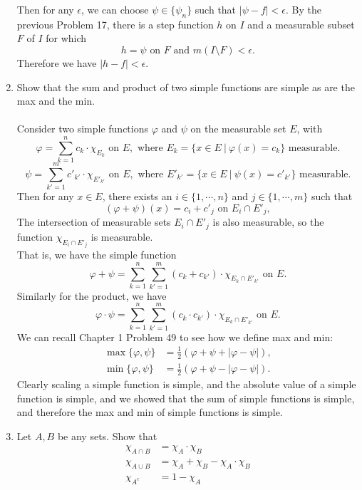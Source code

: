 \begin{enumerate}
    Then for any $\epsilon$, we can choose $\psi\in\{\psi_n\}$ such that $|\psi-f|<\epsilon$.
    By the previous Problem 17, there is a step function $h$ on $I$ and a measurable subset $F$ of $I$ for which 
    \[
        h=\psi\text{ on }F\text{ and }m(I\setminus F)<\epsilon.    
    \] 
    Therefore we have $|h-f|<\epsilon$.
    \item Show that the sum and product of two simple functions are simple as are the max and the min.\\
    \\Consider two simple functions $\varphi$ and $\psi$ on the measurable set $E$, with
    \[
        \varphi=\sum_{k=1}^n c_k\cdot\chi_{E_k}\text{ on }E,\text{ where }E_k=\{x\in E\ |\ \varphi(x)=c_k\}\text{ measurable}.  
    \]
    \[
        \psi=\sum_{k'=1}^m c'_{k'}\cdot\chi_{E'_{k'}}\text{ on }E,\text{ where }E'_{k'}=\{x\in E\ |\ \psi(x)=c'_{k'}\}\text{ measurable}.  
    \]
    Then for any $x\in E$, there exists an $i\in \{1,\cdots,n\}$ and $j\in \{1,\cdots,m\}$ such that
    \[
        (\varphi+\psi)(x)= c_i+c'_j\text{ on }E_i\cap E'_j,
    \]
    The intersection of measurable sets $E_i\cap E'_j$ is also measurable, so the function $\chi_{E_i\cap E'_j}$ is measurable.\\ 
    That is, we have the simple function
    \[
        \varphi+\psi=\sum_{k=1}^n \sum_{k'=1}^m (c_k+c_{k'})\cdot\chi_{E_k\cap E'_{k'}}\text{ on }E.
    \]
    Similarly for the product, we have
    \[
        \varphi\cdot\psi=\sum_{k=1}^n \sum_{k'=1}^m (c_k\cdot c_{k'})\cdot\chi_{E_k\cap E'_{k'}}\text{ on }E.
    \]
    We can recall Chapter 1 Problem 49 to see how we define max and min:
    \begin{align*}
        \max\{\varphi,\psi\}&=\frac{1}{2}(\varphi+\psi+|\varphi-\psi|),\\
        \min\{\varphi,\psi\}&=\frac{1}{2}(\varphi+\psi-|\varphi-\psi|).
    \end{align*}
    Clearly scaling a simple function is simple, and the absolute value of a simple function is simple, and we showed that the sum of simple functions is simple, and therefore the max and min of simple functions is simple.
    \item Let $A,B$ be any sets. Show that
    \begin{align*}
        \chi_{A\cap B}&=\chi_A\cdot\chi_B\\
        \chi_{A\cup B}&=\chi_A+\chi_B-\chi_A\cdot\chi_B\\
        \chi_{A^c}&=1-\chi_A
    \end{align*}

\end{enumerate}
